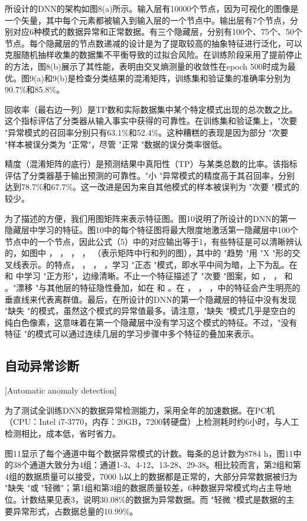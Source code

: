 所设计的DNN的架构如图8(a)所示。输入层有10000个节点，因为可视化的图像是一个矢量，其中每个元素都被输入到输入层的一个节点中。输出层有7个节点，分别对应6种模式的数据异常和正常数据。有三个隐藏层，分别有100个、75个、50个节点。每个隐藏层的节点数递减的设计是为了提取较高的抽象特征进行泛化，可以克服随机抽样收集的数据集不平衡导致的过拟合风险。在训练阶段采用了提前停止的方法，图8(b)展示了其性能，表明由交叉熵测量的收敛性在epoch 500时成为最优。图9(a)和9(b)是检查分类结果的混淆矩阵，训练集和验证集的准确率分别为90.7\%和85.8\%。

回收率（最右边一列）是TP数和实际数据集中某个特定模式出现的总次数之比。这个指标评估了分类器从输入事实中获得的可靠性。在训练集和验证集上，"次要 "异常模式的召回率分别只有63.1\%和52.4\%。这种糟糕的表现是因为部分 "次要 "样本被误分类为 "正常"，尽管 "正常 "数据的误分类率很低。

精度（混淆矩阵的底行）是预测结果中真阳性（TP）与某类总数的比率。该指标评估了分类器基于输出预测的可靠性。"小 "异常模式的精度高于其召回率，分别达到78.7\%和67.7\%。这一改进是因为来自其他模式的样本被误判为 "次要 "模式的较少。

为了描述的方便，我们用图矩阵来表示特征图。图10说明了所设计的DNN的第一隐藏层中学习的特征。图10中的每个特征图将最大限度地激活第一隐藏层中100个节点中的一个节点，因此公式（5）中的对应输出等于1，有些特征是可以清晰辨认的，如图中 ， ， ， ， （表示矩阵中行和列的图），其中的 "趋势 "用 "X "形的交叉线表示。的特点， ， ， ，学习 "正态 "模式，即水平中间为暗，上下为乱。在 和 中学习 "正方形"，边缘清晰。不止一个特征描述了 "次要 "图案，如 ， ， 和 。"漂移 "与其他层的特征隐性叠加，如在 和 。在 ， ， ，中的特征会产生明亮的垂直线来代表离群值。最后，在所设计的DNN的第一个隐藏层的特征中没有发现 "缺失 "的模式，虽然这个模式的异常值最多。请注意，"缺失 "模式几乎是空白的纯白色像素，这意味着在第一个隐藏层中没有学习这个模式的特征。不过，"没有特征 "的模式可以通过连续几层的学习步骤中多个特征的叠加来表示。

\subsection{自动异常诊断}[Automatic anomaly detection]


为了测试全训练DNN的数据异常检测能力，采用全年的加速数据。在PC机（CPU：Intel i7-3770，内存：20GB，7200转硬盘）上检测耗时约6小时，与人工检测相比，成本低，省时省力。

图11显示了每个通道中每个数据异常模式的计数。每条的总计数为8784 h，图11中的38个通道大致分为4组：通道1-3、4-12、13-28、29-38。相比较而言，第2组和第4组的数据质量可以接受，7000 h以上的数据都是正常的，大部分异常数据被归为 "缺失 "或 "轻微"；第1组和第3组的数据质量较差，6种数据异常模式均占主导地位。计数结果见表3，说明30.08\%的数据为异常数据。而 "轻微 "模式是数据的主要异常形式，占数据总量的10.99\%。

